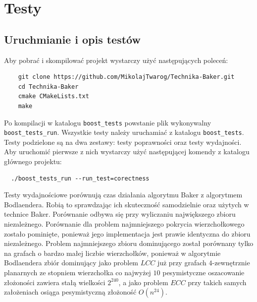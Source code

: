 \documentclass[twoside,a4paper,12pt]{report} %
\theoremstyle{break}
\begin{document}
\section{Testy}

\subsection{Uruchmianie i opis testów}
Aby pobrać i skompilować projekt wystarczy użyć następujących poleceń:

\begin{verbatim}
    git clone https://github.com/MikolajTwarog/Technika-Baker.git
    cd Technika-Baker
    cmake CMakeLists.txt
    make
\end{verbatim}

Po kompilacji w katalogu \texttt{boost\_tests} powstanie plik wykonywalny \texttt{boost\_tests\_run}. Wszystkie testy należy uruchamiać z katalogu \texttt{boost\_tests}. Testy podzielone są na dwa zestawy: testy poprawności oraz testy wydajności. Aby uruchomić pierwsze z nich wystarczy użyć następującej komendy z katalogu głównego projektu:
\begin{verbatim}
  ./boost_tests_run --run_test=corectness
\end{verbatim}

Testy wydajnościowe porównują czas działania algorytmu Baker z algorytmem Bodlaendera. Robią to sprawdzając ich skuteczność samodzielnie oraz użytych w technice Baker. Porównanie odbywa się przy wyliczaniu największego zbioru niezależnego. Porównanie dla problem najmniejszego pokrycia wierzchołkowego zostało pominięte, ponieważ jego implementacja jest prawie identyczna do zbioru niezależnego. Problem najmniejszego zbioru dominującego został porównany tylko na grafach o bardzo małej liczbie wierzchołków, ponieważ w algorytmie Bodlaendera zbiór dominujący jako problem $LCC$ już przy grafach $4$-zewnętrznie planarnych ze stopniem wierzchołka co najwyżej $10$ pesymistyczne oszacowanie złożoności zawiera stałą wielkości $2^{240}$, a jako problem $ECC$ przy takich samych założeniach osiąga pesymistyczną złożoność $O(n^{24})$.
\end{document}
